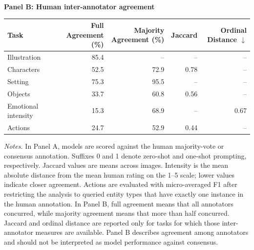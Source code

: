 \begin{table}[t]
  \textbf{Panel B: Human inter-annotator agreement}
  \par\smallskip
  \begin{tabular}{lrrrr}
    \toprule
    Task & Full Agreement (\%) & Majority Agreement (\%) & Jaccard &
    Ordinal Distance $\downarrow$ \\
    \midrule
    Illustration        & 85.4 & --   & --   & --   \\
    Characters          & 52.5 & 72.9 & 0.78 & --   \\
    Setting             & 75.3 & 95.5 & --   & --   \\
    Objects             & 33.7 & 60.8 & 0.56 & --   \\
    Emotional intensity & 15.3 & 68.9 & --   & 0.67 \\
    Actions             & 24.7 & 52.9 & 0.44 & --   \\
    \bottomrule
  \end{tabular}

  \begin{minipage}{0.98\textwidth}
    \vspace{0.5em}
    \footnotesize
    \textit{Notes.} In Panel A, models are scored against the human
    majority-vote or consensus annotation. Suffixes 0 and 1 denote zero-shot and
    one-shot prompting, respectively. Jaccard values are means across images.
    Intensity is the mean absolute distance from the mean human rating on the
    1--5 scale; lower values indicate closer agreement. Actions are evaluated
    with micro-averaged F1 after restricting the analysis to queried entity types
    that have exactly one instance in the human annotation. In Panel B, full
    agreement means that all annotators concurred, while majority agreement means
    that more than half concurred. Jaccard and ordinal distance are reported only
    for tasks for which those inter-annotator measures are available. Panel B
    describes agreement among annotators and should not be interpreted as model
    performance against consensus.
  \end{minipage}
\end{table}

